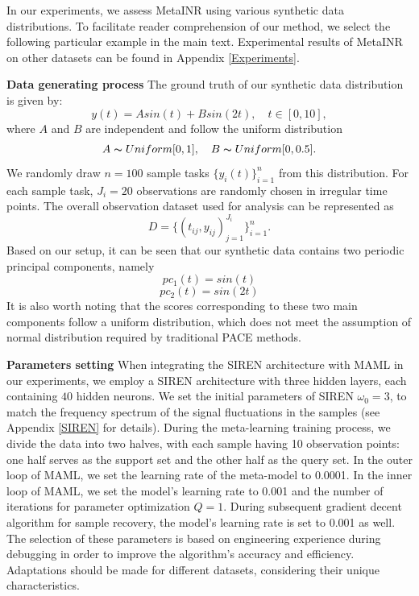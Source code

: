 \documentclass{article}
\begin{document}

In our experiments, we assess MetaINR using various synthetic data distributions.
To facilitate reader comprehension of our method, we select the following particular example in the main text.
Experimental results of MetaINR on other datasets can be found in Appendix \ref{Experiments}.

\textbf{Data generating process}
The ground truth of our synthetic data distribution is given by:
$$
y(t)=A sin(t)+ B sin(2t), \quad t \in [0,10],
$$
where $A$ and $B$ are independent and follow the uniform distribution
$$
A \thicksim Uniform[0,1], \quad B \thicksim Uniform[0,0.5].
$$
We randomly draw $n=100$ sample tasks $\{y_i(t)\}_{i=1}^n$ from this distribution.
For each sample task, $J_i=20$ observations are randomly chosen in irregular time points.
The overall observation dataset used for analysis can be represented as
$$
D=\{(t_{ij},y_{ij})_{j=1}^{J_i}\}_{i=1}^n.
$$
Based on our setup, it can be seen that our synthetic data contains two periodic principal components, namely
$$
pc_1(t)=sin(t)
$$
$$
pc_2(t)=sin(2t)
$$
It is also worth noting that the scores corresponding to these two main components follow a uniform distribution, 
which does not meet the assumption of normal distribution required by traditional PACE methods. 

\textbf{Parameters setting} 
When integrating the SIREN architecture with MAML in our experiments, 
we employ a SIREN architecture with three hidden layers, each containing $40$ hidden neurons.
We set the initial parameters of SIREN $\omega_0=3$, to match the frequency spectrum of the signal fluctuations in the samples (see Appendix \ref{SIREN} for details).
During the meta-learning training process, we divide the data into two halves, with each sample having 10 observation points: one half serves as the support set and the other half as the query set.
In the outer loop of MAML, we set the learning rate of the meta-model to 0.0001. 
In the inner loop of MAML, we set the model's learning rate to 0.001 and the number of iterations for parameter optimization $Q=1$.
During subsequent gradient decent algorithm for sample recovery, the model's learning rate is set to 0.001 as well.
The selection of these parameters is based on engineering experience during debugging in order to improve the algorithm's accuracy and efficiency.
Adaptations should be made for different datasets, considering their unique characteristics.
\end{document}
